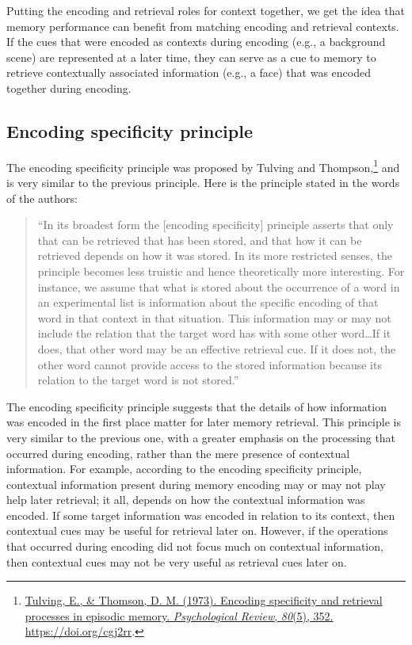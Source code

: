 \documentclass[
  oneside,
  12pt]{crumpbook}
\begin{document}
Putting the encoding and retrieval roles for context together, we get the idea that memory performance can benefit from matching encoding and retrieval contexts. If the cues that were encoded as contexts during encoding (e.g., a background scene) are represented at a later time, they can serve as a cue to memory to retrieve contextually associated information (e.g., a face) that was encoded together during encoding.

\hypertarget{encoding-specificity-principle}{%
\subsection{Encoding specificity principle}\label{encoding-specificity-principle}}

The encoding specificity principle was proposed by Tulving and Thompson,\footnote{\protect\hyperlink{ref-tulvingEncodingSpecificityRetrieval1973}{Tulving, E., \& Thomson, D. M. (1973). Encoding specificity and retrieval processes in episodic memory. \emph{Psychological Review}, \emph{80}(5), 352. \url{https://doi.org/cgj2rr}}.} and is very similar to the previous principle. Here is the principle stated in the words of the authors:

\begin{quote}
``In its broadest form the {[}encoding specificity{]} principle asserts that only that can be retrieved that has been stored, and that how it can be retrieved depends on how it was stored. In its more restricted senses, the principle becomes less truistic and hence theoretically more interesting. For instance, we assume that what is stored about the occurrence of a word in an experimental list is information about the specific encoding of that word in that context in that situation. This information may or may not include the relation that the target word has with some other word\ldots If it does, that other word may be an effective retrieval cue. If it does not, the other word cannot provide access to the stored information because its relation to the target word is not stored.''
\end{quote}

The encoding specificity principle suggests that the details of how information was encoded in the first place matter for later memory retrieval. This principle is very similar to the previous one, with a greater emphasis on the processing that occurred during encoding, rather than the mere presence of contextual information. For example, according to the encoding specificity principle, contextual information present during memory encoding may or may not play help later retrieval; it all, depends on how the contextual information was encoded. If some target information was encoded in relation to its context, then contextual cues may be useful for retrieval later on. However, if the operations that occurred during encoding did not focus much on contextual information, then contextual cues may not be very useful as retrieval cues later on.
\end{document}
